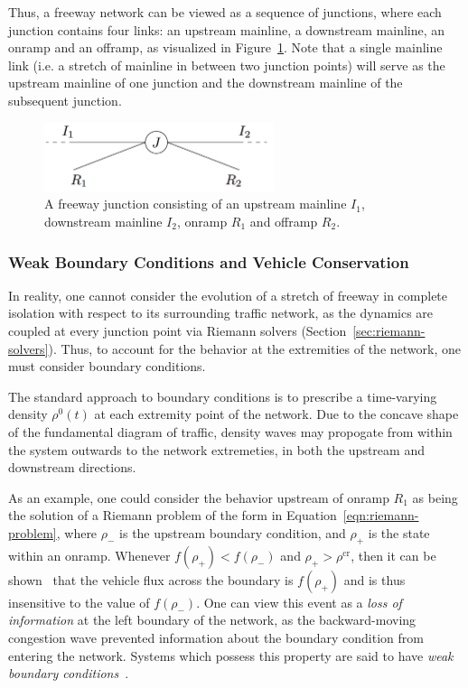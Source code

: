 Thus, a freeway network can be viewed as a sequence of junctions, where each junction contains four links: an upstream mainline, a downstream mainline, an onramp and an offramp, as visualized in Figure~\ref{fig:simple-junction}. Note that a single mainline link (i.e. a stretch of mainline in between two junction points) will serve as the upstream mainline of one junction and the downstream mainline of the subsequent junction.

\begin{figure}[htbp]
	\centering
	\includegraphics[width=0.6\textwidth]{diagrams/simple-junction}
	\caption{A freeway junction consisting of an upstream mainline $I_1$, downstream mainline $I_2$, onramp $R_1$ and offramp $R_2$.}
	\label{fig:simple-junction}
\end{figure}

\subsubsection{Weak Boundary Conditions and Vehicle Conservation}

In reality, one cannot consider the evolution of a stretch of freeway in complete isolation with respect to its surrounding traffic network, as the dynamics are coupled at every junction point via Riemann solvers (Section~\ref{sec:riemann-solvers}). Thus, to account for the behavior at the extremities of the network, one must consider boundary conditions.

The standard approach to boundary conditions is to prescribe a time-varying density $\rho^0\left(t\right)$ at each extremity point of the network. Due to the concave shape of the fundamental diagram of traffic, density waves may propogate from within the system outwards to the network extremeties, in both the upstream and downstream directions.

As an example, one could consider the behavior upstream of onramp $R_1$ as being the solution of a Riemann problem of the form in Equation~\eqref{eqn:riemann-problem}, where $\rho_-$ is the upstream boundary condition, and $\rho_+$ is the state within an onramp. Whenever $f\left(\rho_+\right)<f\left(\rho_-\right)$ and $\rho_+ > \rho^{\text{cr}}$, then it can be shown~\cite{lebacque1996godunov,garavello2006traffic} that the vehicle flux across the boundary is $f\left(\rho_+\right)$ and is thus insensitive to the value of $f\left(\rho_-\right)$. One can view this event as a \emph{loss of information} at the left boundary of the network, as the backward-moving congestion wave prevented information about the boundary condition from entering the network. Systems which possess this property are said to have \emph{weak boundary conditions}~\cite{strub2006weak}.

